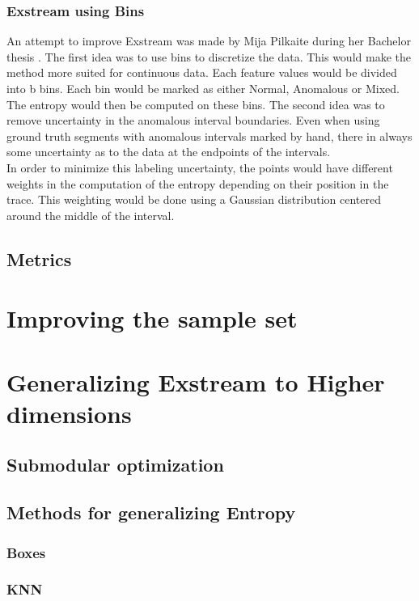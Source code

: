 \documentclass[oneside, a4paper, onecolumn, 11pt]{article}
\begin{document}
\subsubsection{Exstream using Bins}
An attempt to improve Exstream was made by Mija Pilkaite during her Bachelor thesis \cite{MijaExstream}. The first idea was to use bins to discretize the data. This would make the method more suited for continuous data. Each feature values would be divided into b bins. Each bin would be marked as either Normal, Anomalous or Mixed. The entropy would then be computed on these bins. 
The second idea was to remove uncertainty in the anomalous interval boundaries. Even when using ground truth segments with anomalous intervals marked by hand, there in always some uncertainty as to the data at the endpoints of the intervals. \\
In order to minimize this labeling uncertainty, the points would have different weights in the computation of the entropy depending on their position in the trace. This weighting would be done using a Gaussian distribution centered around the middle of the interval.\\

\cite{MijaExstream}
\subsection{Metrics}


\section{Improving the sample set}

\section{Generalizing Exstream to Higher dimensions}
\subsection{Submodular optimization}
\subsection{Methods for generalizing Entropy}
\subsubsection{Boxes}
\subsubsection{KNN}
\end{document}
